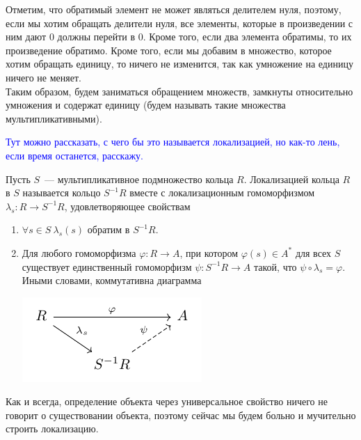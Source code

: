 \documentclass[11pt]{article}
\begin{document}
    \begin{remark}
        Отметим, что обратимый элемент не может являться делителем нуля, поэтому, если мы хотим обращать делители нуля,
        все элементы, которые в произведении с ним дают 0 должны перейти в 0. Кроме того, если два элемента обратимы, то их
        произведение обратимо. Кроме того, если мы добавим в множество, которое хотим обращать единицу, то ничего не изменится, так как
        умножение на единицу ничего не меняет. \\

        Таким образом, будем заниматься обращением множеств, замкнуты относительно умножения и содержат единицу (будем называть такие
        множества мультипликативными).
    \end{remark}
    \textcolor{blue}{Тут можно рассказать, с чего бы это называется локализацией, но как-то лень, если время останется, расскажу.}
    \begin{definition}
        Пусть $S$~--- мультипликативное подмножество кольца $R$. Локализацией кольца $R$ в $S$ называется кольцо $S^{-1}R$ вместе с
        локализационным гомоморфизмом $\lambda_s\colon R \to S^{-1}R$, удовлетворяющее свойствам
        \begin{enumerate}
            \item $\forall s \in S \ \lambda_s(s)$ обратим в $S^{-1}R$.
            \item Для любого гомоморфизма $\varphi\colon R \to A$, при котором $\varphi(s) \in A^{*}$ для всех $S$ существует
                  единственный гомоморфизм $\psi\colon S^{-1}R \to A$ такой, что $\psi \circ \lambda_s = \varphi$.
                  Иными словами, коммутативна диаграмма
                  \begin{center}
                      \includegraphics[scale = 1]{cd.pdf}
                  \end{center}

        \end{enumerate}
    \end{definition}

    Как и всегда, определение объекта через универсальное свойство ничего не говорит о существовании объекта, поэтому
    сейчас мы будем больно и мучительно строить локализацию.\\
\end{document}
